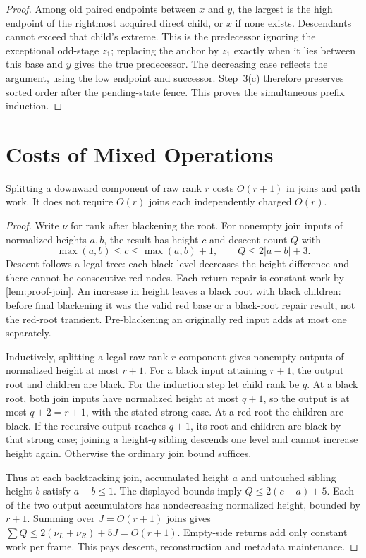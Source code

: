 \begin{proof}
Among old paired endpoints between $x$ and $y$, the largest is the high
endpoint of the rightmost acquired direct child, or $x$ if none exists.
Descendants cannot exceed that child's extreme. This is the predecessor
ignoring the exceptional odd-stage $z_1$; replacing the anchor by $z_1$
exactly when it lies between this base and $y$ gives the true predecessor.
The decreasing case reflects the argument, using the low endpoint and
successor. Step~3(c) therefore preserves sorted order after the pending-state
fence. This proves the simultaneous prefix induction.
\end{proof}

\section{Costs of Mixed Operations}
\label{sec:proof-cost}

\begin{lemma}
\label{lem:proof-telescoping}
Splitting a downward component of raw rank $r$ costs $O(r+1)$ in joins and
path work. It does not require $O(r)$ joins each independently charged $O(r)$.
\end{lemma}
\begin{proof}
Write $\nu$ for rank after blackening the root. For nonempty join inputs of
normalized heights $a,b$, the result has height $c$ and descent count $Q$ with
\[
 \max(a,b)\leq c\leq\max(a,b)+1,\qquad Q\leq2|a-b|+3.
\]
Descent follows a legal tree: each black level decreases the height difference
and there cannot be consecutive red nodes. Each return repair is constant
work by \cref{lem:proof-join}. An increase in height leaves a black root with
black children: before final blackening it was the valid red base or a
black-root repair result, not the red-root transient. Pre-blackening an
originally red input adds at most one separately.

Inductively, splitting a legal raw-rank-$r$ component gives nonempty outputs
of normalized height at most $r+1$. For a black input attaining $r+1$,
the output root and children are black. For the induction step let child
rank be $q$. At a black root, both join inputs have normalized height at
most $q+1$, so the output is at most $q+2=r+1$, with the stated strong case.
At a red root the children are black. If the recursive output reaches
$q+1$, its root and children are black by that strong case; joining a
height-$q$ sibling descends one level and cannot increase height again.
Otherwise the ordinary join bound suffices.

Thus at each backtracking join, accumulated height $a$ and untouched sibling
height $b$ satisfy $a-b\leq1$. The displayed bounds imply
$Q\leq2(c-a)+5$. Each of the two output accumulators has nondecreasing
normalized height, bounded by $r+1$. Summing over $J=O(r+1)$ joins gives
$\sum Q\leq2(\nu_L+\nu_R)+5J=O(r+1)$. Empty-side returns add only constant
work per frame. This pays descent, reconstruction and metadata maintenance.
\end{proof}

